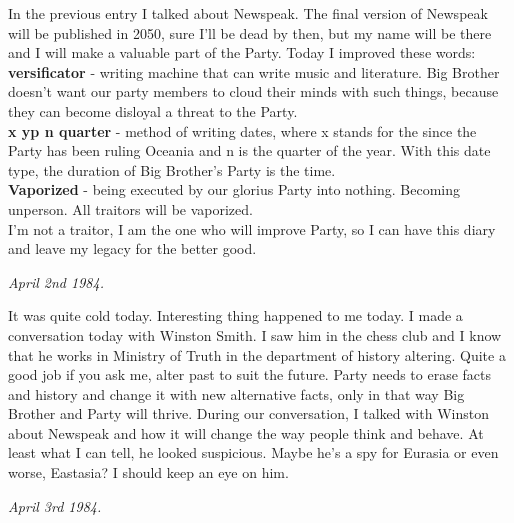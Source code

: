 \documentclass[12pt,a4paper]{article}
\begin{document}
In the previous entry I talked about Newspeak. The final version of Newspeak will be published in 2050, sure I'll be dead by then, but my name will be there and I will make a valuable part of the Party. Today I improved these words:\\

\textbf{versificator} - writing machine that can write music and literature. Big Brother doesn't want our party members to cloud their minds with such things, because they can become disloyal a threat to the Party.\\

\textbf{x yp n quarter} - method of writing dates, where x stands for the since the Party has been ruling Oceania and n is the quarter of the year. With this date type, the duration of Big Brother's Party is the time.\\

\textbf{Vaporized} - being executed by our glorius Party into nothing. Becoming unperson. All traitors will be vaporized.\\

I'm not a traitor, I am the one who will improve Party, so I can have this diary and leave my legacy for the better good.\\

\begin{flushleft}
  \textit{April 2nd 1984.}
  \end{flushleft}

It was quite cold today. Interesting thing happened to me today. I made a conversation today with Winston Smith. I saw him in the chess club and I know that he works in Ministry of Truth in the department of history altering. Quite a good job if you ask me, alter past to suit the future. Party needs to erase facts and history and change it with new alternative facts, only in that way Big Brother and Party will thrive. During our conversation, I talked with Winston about Newspeak and how it will change the way people think and behave. At least what I can tell, he looked suspicious. Maybe he's a spy for Eurasia or even worse, Eastasia? I should keep an eye on him.\\

\begin{flushleft}
  \textit{April 3rd 1984.}
  \end{flushleft}
\end{document}
